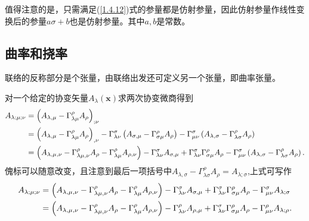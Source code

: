 \documentclass[11pt, a4paper, oneside, onecolumn]{ctexart}
\numberwithin{equation}{subsection}
\begin{document}
值得注意的是，只需满足(\ref{1.4.12})式的参量都是仿射参量，因此仿射参量作线性变换后的参量$a\sigma+b$也是仿射参量。其中$a,b$是常数。

\subsection{曲率和挠率}
联络的反称部分是个张量，由联络出发还可定义另一个张量，即曲率张量。

对一个给定的协变矢量$A_{\lambda}\left(\boldsymbol{x}\right)$求两次协变微商得到
\begin{align}
A_{\lambda;\mu;\nu}&=\left(A_{\lambda,\mu}-\Gamma_{\lambda\mu}^{\rho}A_{\rho}\right)_{;\nu}\notag\\
&=\left(A_{\lambda,\mu}-\Gamma_{\lambda\mu}^{\rho}A_{\rho}\right)_{,\nu}-\Gamma_{\lambda\nu}^{\sigma}\left(A_{\sigma,\mu}-\Gamma_{\sigma\mu}^{\rho}A_{\rho}\right)-\Gamma_{\mu\nu}^{\sigma}\left(A_{\lambda,\sigma}-\Gamma_{\lambda\sigma}^{\rho}A_{\rho}\right)\notag\\
&=\left(A_{\lambda,\mu,\nu}-\Gamma_{\lambda\mu,\nu}^{\rho}A_{\rho}-\Gamma_{\lambda\mu}^{\rho}A_{\rho,\nu}\right)-\Gamma_{\lambda\nu}^{\sigma}A_{\sigma,\mu}+\Gamma_{\lambda\nu}^{\sigma}\Gamma_{\sigma\mu}^{\rho}A_{\rho}-\Gamma_{\mu\nu}^{\sigma}\left(A_{\lambda,\sigma}-\Gamma_{\lambda\sigma}^{\rho}A_{\rho}\right).
\end{align}
傀标可以随意改变，且注意到最后一项括号中$A_{\lambda,\sigma}-\Gamma_{\lambda\sigma}^{\rho}A_{\rho}=A_{\lambda;\sigma}$,上式可写作
\begin{align}
A_{\lambda;\mu;\nu}&=\left(A_{\lambda,\mu,\nu}-\Gamma_{\lambda\mu,\nu}^{\rho}A_{\rho}-\Gamma_{\lambda\mu}^{\rho}A_{\rho,\nu}\right)-\Gamma_{\lambda\nu}^{\sigma}A_{\sigma,\mu}+\Gamma_{\lambda\nu}^{\sigma}\Gamma_{\sigma\mu}^{\rho}A_{\rho}-\Gamma_{\mu\nu}^{\sigma}A_{\lambda;\sigma}\notag\\
&=\left(A_{\lambda,\mu,\nu}-\Gamma_{\lambda\mu,\nu}^{\rho}A_{\rho}-\Gamma_{\lambda\mu}^{\rho}A_{\rho,\nu}\right)-\Gamma_{\lambda\nu}^{\rho}A_{\rho,\mu}+\Gamma_{\lambda\nu}^{\sigma}\Gamma_{\sigma\mu}^{\rho}A_{\rho}-\Gamma_{\mu\nu}^{\rho}A_{\lambda;\rho}.
\end{align}
\end{document}
